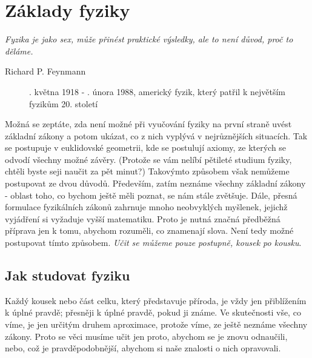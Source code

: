 \setchaptertoc
\chapter{Základy fyziky}\label{fyz:IchapI}
\epigraph{\emph{Fyzika je jako sex, může přinést praktické výsledky, ale to není důvod, proč to 
  děláme.}}{Richard P. Feynmann}

  \begin{figure}[ht!]  %
    \centering
    \caption{\wikiFeynman {}. května 1918 - . února 1988, 
             americký fyzik, který patřil k největším fyzikům 20. století}
    \label{fyz:fig067}
  \end{figure} 

    Možná se zeptáte, zda není možné při vyučování fyziky na první straně uvést základní zákony a 
    potom ukázat, co z nich vyplývá v nejrůznějších situacích. Tak se postupuje v euklidovské 
    geometrii, kde se postulují axiomy, ze kterých se odvodí všechny možné závěry. (Protože se vám 
    nelíbí pětileté studium fyziky, chtěli byste seji naučit za pět minut?) Takovýmto způsobem však 
    nemůžeme postupovat ze dvou důvodů. Především, zatím neznáme všechny základní zákony - oblast 
    toho, co bychom ještě měli poznat, se nám stále zvětšuje. Dále, přesná formulace fyzikálních 
    zákonů zahrnuje mnoho neobvyklých myšlenek, jejichž vyjádření si vyžaduje vyšší matematiku. 
    Proto je nutná značná předběžná příprava jen k tomu, abychom rozuměli, co znamenají slova. Není 
    tedy možné postupovat tímto způsobem. \emph{Učit se můžeme pouze postupně, kousek po kousku}.

  \section{Jak studovat fyziku}\label{fyz:IchapIsecI}
    Každý kousek nebo část celku, který představuje příroda, je vždy jen přiblížením k úplné 
    pravdě; přesněji k úplné pravdě, pokud ji známe. Ve skutečnosti vše, co víme, je jen určitým 
    druhem aproximace, protože víme, ze ještě neznáme všechny zákony. Proto se věci musíme učit jen 
    proto, abychom se je znovu odnaučili, nebo, což je pravděpodobnější, abychom si naše znalosti o 
    nich opravovali.
    
